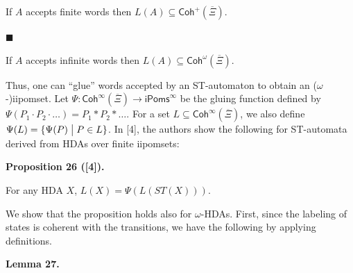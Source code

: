 If $A$ accepts finite words then $L(A)\subseteq\mathsf{Coh}^{+}(\overline{\Xi})$.\par
 
 
 
\par\noindent  $\blacksquare$ 
 
If $A$ accepts infinite words then $L(A)\subseteq\mathsf{Coh}^{\omega}(\overline{\Xi})$.\par
 
 
  
 
 
 
Thus, one can “glue” words accepted by an ST-automaton to obtain an ($\omega$-)iipomset. Let $\Psi\colon\mathsf{Coh}^{\infty}(\overline{\Xi})\to{\mathsf{iPoms}^{\infty}}$ be the gluing function defined by $\Psi(P_{1}\cdot P_{2}\cdot\dots)=P_{1}*P_{2}*\dots$. For a set $L\subseteq\mathsf{Coh}^{\infty}(\overline{\Xi})$, we also define $\Psi(L)={\{\Psi(P)\mathrel{\big{|}}P\in L\}}$. In [4], the authors show the following for ST-automata derived from HDAs over finite iipomsets:\par
 
 
 
\par\medskip\noindent\textbf{Proposition 26 ([4]).}\par
 
 
For any HDA $X$, $L(X)=\Psi(L(ST(X)))$.\par
 
 
 
 
We show that the proposition holds also for $\omega$-HDAs. First, since the labeling of states is coherent with the transitions, we have the following by applying definitions.\par
 
 
 
\par\medskip\noindent\textbf{Lemma 27.}\par
 
 
